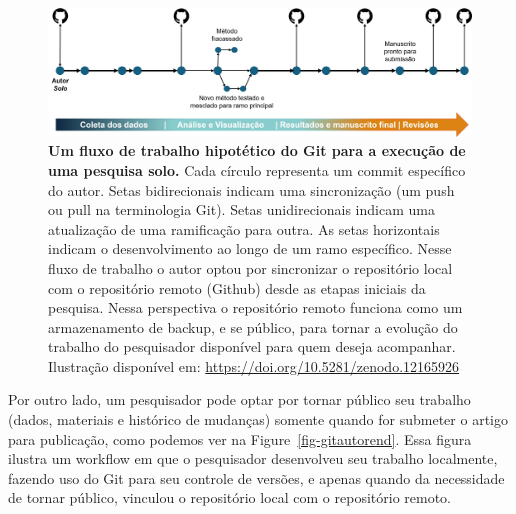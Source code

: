 \documentclass[
  a4paper,
]{article}
\begin{document}
\begin{figure}

\includegraphics{img/gitautorbegin.jpg}

\caption{\label{fig-gitautorbegin}\textbf{Um fluxo de trabalho
hipotético do Git para a execução de uma pesquisa solo.} Cada círculo
representa um commit específico do autor. Setas bidirecionais indicam
uma sincronização (um push ou pull na terminologia Git). Setas
unidirecionais indicam uma atualização de uma ramificação para outra. As
setas horizontais indicam o desenvolvimento ao longo de um ramo
específico. Nesse fluxo de trabalho o autor optou por sincronizar o
repositório local com o repositório remoto (Github) desde as etapas
iniciais da pesquisa. Nessa perspectiva o repositório remoto funciona
como um armazenamento de backup, e se público, para tornar a evolução do
trabalho do pesquisador disponível para quem deseja acompanhar.
Ilustração disponível em: \url{https://doi.org/10.5281/zenodo.12165926}}

\end{figure}%

Por outro lado, um pesquisador pode optar por tornar público seu
trabalho (dados, materiais e histórico de mudanças) somente quando for
submeter o artigo para publicação, como podemos ver na
Figure~\ref{fig-gitautorend}. Essa figura ilustra um workflow em que o
pesquisador desenvolveu seu trabalho localmente, fazendo uso do Git para
seu controle de versões, e apenas quando da necessidade de tornar
público, vinculou o repositório local com o repositório remoto.
\end{document}
